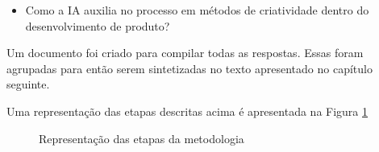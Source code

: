 \begin{itemize}

    \item Como a IA auxilia no processo em métodos de criatividade dentro do desenvolvimento de produto?


\end{itemize}

Um documento foi criado para compilar todas as respostas. Essas foram agrupadas para então serem sintetizadas no texto apresentado no capítulo seguinte.

Uma representação das etapas descritas acima é apresentada na Figura \ref{fig:funil_metodologia}

\begin{figure}[!htb]
    \centering
    
    \caption{Representação das etapas da metodologia}
    \label{fig:funil_metodologia}
\end{figure}